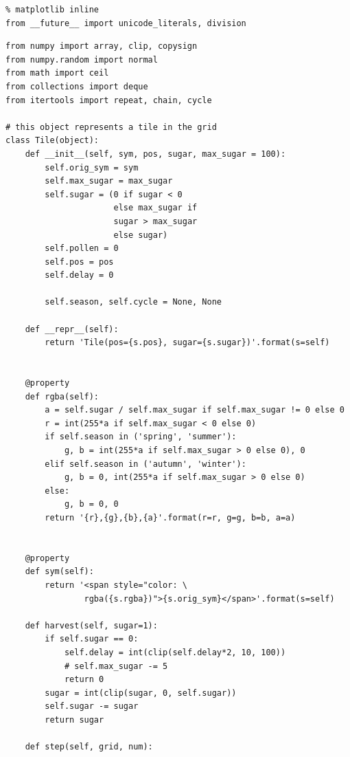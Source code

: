 \newpage

\setlength\bibsep{\parskip}
{}
\null
\vfilneg
{\let\clearpage\relax\listoffigures}




\begin{verbatim}
% matplotlib inline
from __future__ import unicode_literals, division
\end{verbatim}


\begin{verbatim}
from numpy import array, clip, copysign
from numpy.random import normal
from math import ceil
from collections import deque
from itertools import repeat, chain, cycle

# this object represents a tile in the grid
class Tile(object):
    def __init__(self, sym, pos, sugar, max_sugar = 100):        
        self.orig_sym = sym
        self.max_sugar = max_sugar
        self.sugar = (0 if sugar < 0 
                      else max_sugar if 
                      sugar > max_sugar 
                      else sugar)
        self.pollen = 0
        self.pos = pos   
        self.delay = 0

        self.season, self.cycle = None, None
        
    def __repr__(self):
        return 'Tile(pos={s.pos}, sugar={s.sugar})'.format(s=self)


    @property
    def rgba(self):        
        a = self.sugar / self.max_sugar if self.max_sugar != 0 else 0
        r = int(255*a if self.max_sugar < 0 else 0)
        if self.season in ('spring', 'summer'):
            g, b = int(255*a if self.max_sugar > 0 else 0), 0
        elif self.season in ('autumn', 'winter'):
            g, b = 0, int(255*a if self.max_sugar > 0 else 0)
        else:
            g, b = 0, 0 
        return '{r},{g},{b},{a}'.format(r=r, g=g, b=b, a=a)
    

    @property
    def sym(self):
        return '<span style="color: \
                rgba({s.rgba})">{s.orig_sym}</span>'.format(s=self)
        
    def harvest(self, sugar=1):
        if self.sugar == 0:
            self.delay = int(clip(self.delay*2, 10, 100))
            # self.max_sugar -= 5
            return 0
        sugar = int(clip(sugar, 0, self.sugar))
        self.sugar -= sugar        
        return sugar

    def step(self, grid, num):
        

\end{verbatim}
